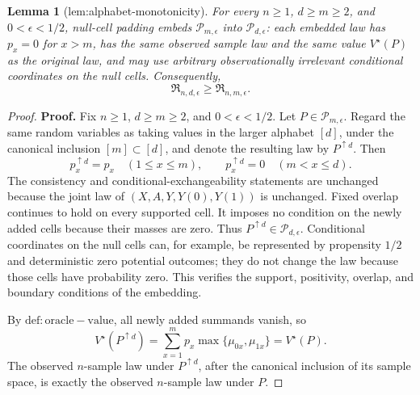 \documentclass{article}
\newtheorem{lemma}{Lemma}
\begin{document}
\begin{lemma}[lem:alphabet-monotonicity]\label{lem:alphabet-monotonicity}
For every \(n\geq1\), \(d\geq m\geq2\), and \(0<\epsilon<1/2\), null-cell padding embeds \(\mathcal P_{m,\epsilon}\) into \(\mathcal P_{d,\epsilon}\): each embedded law has \(p_x=0\) for \(x>m\), has the same observed sample law and the same value \(V^\star(P)\) as the original law, and may use arbitrary observationally irrelevant conditional coordinates on the null cells. Consequently,
\[
 \mathfrak R_{n,d,\epsilon}\geq \mathfrak R_{n,m,\epsilon}.
\]
\end{lemma}
\begin{proof}
\textbf{Proof.}
Fix \(n\geq1\), \(d\geq m\geq2\), and \(0<\epsilon<1/2\).  Let \(P\in\mathcal P_{m,\epsilon}\).  Regard the same random variables as taking values in the larger alphabet \([d]\), under the canonical inclusion \([m]\subset[d]\), and denote the resulting law by \(P^{\uparrow d}\).  Then
\[
 p_x^{\uparrow d}=p_x\quad(1\leq x\leq m),
 \qquad
 p_x^{\uparrow d}=0\quad(m<x\leq d).
\]
The consistency and conditional-exchangeability statements are unchanged because the joint law of \((X,A,Y,Y(0),Y(1))\) is unchanged.  Fixed overlap continues to hold on every supported cell.  It imposes no condition on the newly added cells because their masses are zero.  Thus \(P^{\uparrow d}\in\mathcal P_{d,\epsilon}\).  Conditional coordinates on the null cells can, for example, be represented by propensity \(1/2\) and deterministic zero potential outcomes; they do not change the law because those cells have probability zero.  This verifies the support, positivity, overlap, and boundary conditions of the embedding.

By \(\mathrm{def:oracle-value}\), all newly added summands vanish, so
\[
 V^\star(P^{\uparrow d})
 =\sum_{x=1}^m p_x\max\{\mu_{0x},\mu_{1x}\}
 =V^\star(P).
\]
The observed \(n\)-sample law under \(P^{\uparrow d}\), after the canonical inclusion of its sample space, is exactly the observed \(n\)-sample law under \(P\).


\end{proof}
\end{document}
